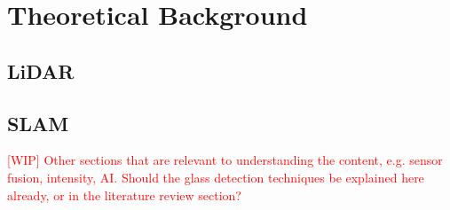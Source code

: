 \chapter{Theoretical Background}

\section{LiDAR}

\section{SLAM}

\textcolor{red}{[WIP] Other sections that are relevant to understanding the content, e.g. sensor fusion, intensity, AI. Should the glass detection techniques be explained here already, or in the literature review section?}